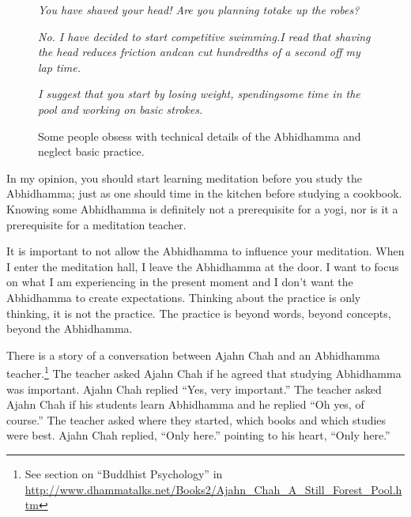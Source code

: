 \begin{figure}[H]
\begin{quoting}
\begin{flushleft}
\textit{You have shaved your head! Are you planning to\newline take up the robes?}
\end{flushleft}
\begin{flushright}
\textit{No. I have decided to start competitive swimming.\linebreak I read that shaving the head reduces friction and\linebreak can cut hundredths of a second off my lap time. }
\end{flushright}
\begin{flushleft}
\textit{I suggest that you start by losing weight, spending\newline some time in the pool and working on basic strokes.}
\end{flushleft}
\end{quoting}
\caption{Some people obsess with technical details of the Abhidhamma and neglect basic practice.}
\label{fig:Swimming}
\end{figure}

In my opinion, you should start learning meditation before you study the Abhidhamma; just as one should time in the kitchen before studying a cookbook. Knowing some Abhidhamma is definitely not a prerequisite for a yogi, nor is it a prerequisite for a meditation teacher.

It is important to not allow the Abhidhamma to influence your meditation. When I enter the meditation hall, I leave the Abhidhamma at the door. I want to focus on what I am experiencing in the present moment and I don’t want the Abhidhamma to create expectations. Thinking about the practice is only thinking, it is not the practice. The practice is beyond words, beyond concepts, beyond the Abhidhamma.

There is a story of a conversation between Ajahn Chah and an Abhidhamma teacher.\footnote{See section on “Buddhist Psychology” in \url{http://www.dhammatalks.net/Books2/Ajahn_Chah_A_Still_Forest_Pool.htm}} The teacher asked Ajahn Chah if he agreed that studying Abhidhamma was important. Ajahn Chah replied “Yes, very important.” The teacher asked Ajahn Chah if his students learn Abhidhamma and he replied “Oh yes, of course.” The teacher asked where they started, which books and which studies were best. Ajahn Chah replied, “Only here.” pointing to his heart, “Only here.”

